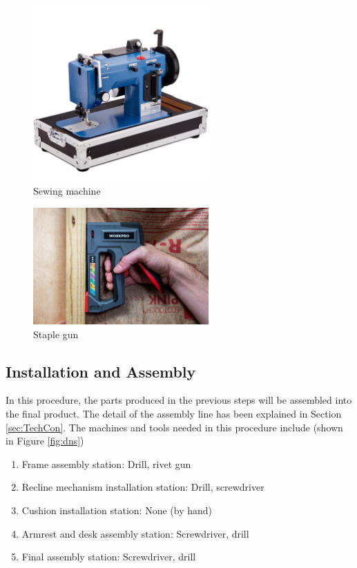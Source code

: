 \begin{figure}[!htp]
    \centering
    \includegraphics[width=0.6\textwidth]{images/sewing machine.jpg}
    \caption{Sewing machine}
    \label{fig:sew}
\end{figure}

\begin{figure}
    \centering
    \includegraphics[width=0.6\textwidth]{images/staple gun.jpg}
    \caption{Staple gun}
    \label{fig:staple}
\end{figure}

\subsection{Installation and Assembly}
In this procedure, the parts produced in the previous steps will be assembled into the final product. The detail of the assembly line has been explained in Section \ref{sec:TechCon}. The machines and tools needed in this procedure include (shown in Figure \ref{fig:dns})
\begin{enumerate}
    \item Frame assembly station: Drill, rivet gun
    \item Recline mechanism installation station: Drill, screwdriver
    \item Cushion installation station: None (by hand)
    \item Armrest and desk assembly station: Screwdriver, drill
    \item Final assembly station: Screwdriver, drill
\end{enumerate}

